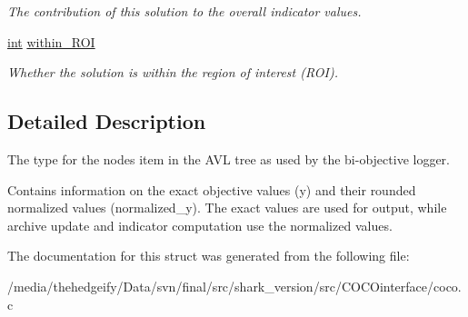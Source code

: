 \begin{DoxyCompactItemize}
\begin{DoxyCompactList}\small\item\em The contribution of this solution to the overall indicator values. \end{DoxyCompactList}\item 
\hyperlink{classint}{int} \hyperlink{structlogger__biobj__avl__item__t_a02c8ee35cdec96471ed1a60824018c3b}{within\+\_\+\+R\+OI}\hypertarget{structlogger__biobj__avl__item__t_a02c8ee35cdec96471ed1a60824018c3b}{}\label{structlogger__biobj__avl__item__t_a02c8ee35cdec96471ed1a60824018c3b}

\begin{DoxyCompactList}\small\item\em Whether the solution is within the region of interest (R\+OI). \end{DoxyCompactList}\end{DoxyCompactItemize}


\subsection{Detailed Description}
The type for the node\textquotesingle{}s item in the A\+VL tree as used by the bi-\/objective logger. 

Contains information on the exact objective values (y) and their rounded normalized values (normalized\+\_\+y). The exact values are used for output, while archive update and indicator computation use the normalized values. 

The documentation for this struct was generated from the following file\+:\begin{DoxyCompactItemize}
\item 
/media/thehedgeify/\+Data/svn/final/src/shark\+\_\+version/src/\+C\+O\+C\+Ointerface/coco.\+c\end{DoxyCompactItemize}
